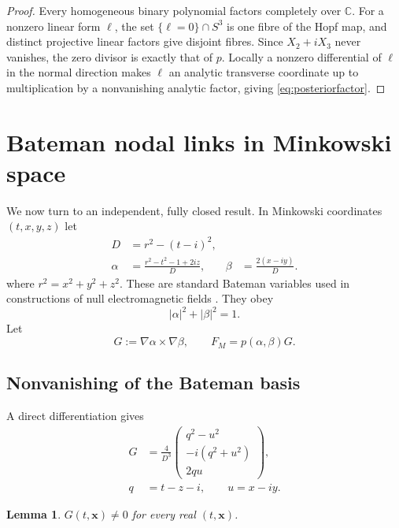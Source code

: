 \documentclass[aps,prd,reprint,nofootinbib,superscriptaddress]{revtex4-2}
\newtheorem{lemma}[theorem]{Lemma}
\theoremstyle{definition}
\theoremstyle{remark}
\newcommand{\C}{\mathbb{C}}
\begin{document}
\begin{proof}
Every homogeneous binary polynomial factors completely over $\C$. For a nonzero linear form $\ell$, the set $\{\ell=0\}\cap S^3$ is one fibre of the Hopf map, and distinct projective linear factors give disjoint fibres. Since $X_2+iX_3$ never vanishes, the zero divisor is exactly that of $p$. Locally a nonzero differential of $\ell$ in the normal direction makes $\ell$ an analytic transverse coordinate up to multiplication by a nonvanishing analytic factor, giving \eqref{eq:posteriorfactor}.
\end{proof}

\section{Bateman nodal links in Minkowski space}
\label{sec:bateman}

We now turn to an independent, fully closed result. In Minkowski coordinates $(t,x,y,z)$ let
\begin{align}
D&=r^2-(t-i)^2,\nonumber\\
\alpha&=\frac{r^2-t^2-1+2iz}{D},
&\beta&=\frac{2(x-iy)}{D}.
\label{eq:bateman}
\end{align}
where $r^2=x^2+y^2+z^2$. These are standard Bateman variables used in constructions of null electromagnetic fields \cite{Kedia2013,IrvineBouwmeester2008}. They obey
\begin{equation}
|\alpha|^2+|\beta|^2=1.
\label{eq:S3identity}
\end{equation}
Let
\begin{equation}
G:=\nabla\alpha\times\nabla\beta,
\qquad
F_M=p(\alpha,\beta)G.
\label{eq:FM}
\end{equation}

\subsection{Nonvanishing of the Bateman basis}

A direct differentiation gives
\begin{align}
G&=\frac{4}{D^3}
\begin{pmatrix}
q^2-u^2\\
-i(q^2+u^2)\\
2qu
\end{pmatrix},
\label{eq:Gexplicit}\\
q&=t-z-i,\qquad u=x-iy.
\nonumber
\end{align}

\begin{lemma}
\label{lem:Gnonzero}
$G(t,\mathbf x)\neq0$ for every real $(t,\mathbf x)$.
\end{lemma}
\end{document}
